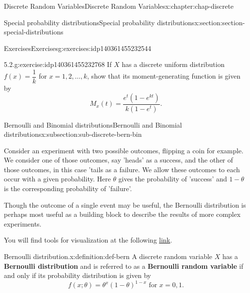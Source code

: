 \documentclass[oneside,10pt,]{book}
\newcommand{\terminology}[1]{\textbf{#1}}
\numberwithin{equation}{section}
\begin{document}
\begin{chapterptx}{Discrete Random Variables}{}{Discrete Random Variables}{}{}{x:chapter:chap-discrete}
\begin{sectionptx}{Special probability distributions}{}{Special probability distributions}{}{}{x:section:section-special-distributions}
%
%
\typeout{************************************************}
\typeout{************************************************}
%
\begin{exercises-subsection}{Exercises}{}{Exercises}{}{}{g:exercises:idp140361455232544}
\begin{divisionexercise}{1}{5.2.}{}{g:exercise:idp140361455232768}%
If \(X\) has a discrete uniform distribution \(f(x) =
\dfrac{1}{k}\) for \(x = 1, 2, \dots, k\), show that its moment-generating function is given by%
\begin{equation*}
M_x(t) =
\dfrac{e^t(1-e^{kt})}{k(1-e^t)}\text{.}
\end{equation*}
%
\end{divisionexercise}%
\end{exercises-subsection}
%
%
\typeout{************************************************}
\typeout{************************************************}
%
\begin{subsectionptx}{Bernoulli and Binomial distributions}{}{Bernoulli and Binomial distributions}{}{}{x:subsection:sub-discrete-bern-bin}
\begin{introduction}{}%
Consider an experiment with two possible outcomes, flipping a coin for example. We consider one of those outcomes, say 'heads' as a success, and the other of those outcomes, in this case 'tails\textasciigrave{} as a failure. We allow these outcomes to each occur with a given probability. Here \(\theta\) gives the probability of 'success' and \(1-\theta\) is the corresponding probability of 'failure'.%
\par
Though the outcome of a single event may be useful, the Bernoulli distribution is perhaps most useful as a building block to describe the results of more complex experiments.%
\par
You will find tools for visualization at the following \href{https://buddy.uco.edu/shiny/slaverty/mathstat/Binomial/}{link}.%
\end{introduction}%
\begin{definition}{Bernoulli distribution.}{x:definition:def-bern}%
A discrete random variable \(\displaystyle X\) has a \terminology{Bernoulli distribution} and is referred to as a \terminology{Bernoulli random variable} if and only if its probability distribution is given by%
\begin{equation*}
f(x; \theta) = \theta^x(1-\theta)^{1-x}
\text{ for }x = 0, 1\text{.}
\end{equation*}

\end{definition}
\end{subsectionptx}
\end{sectionptx}
\end{chapterptx}
\end{document}
